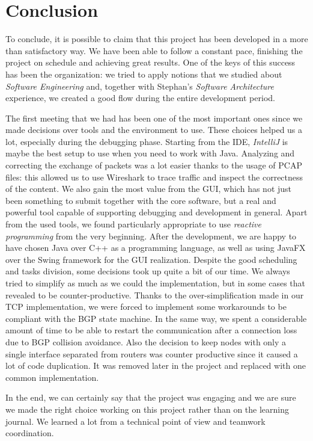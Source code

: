 \chapter{Conclusion}
To conclude, it is possible to claim that this project has been developed in a more than satisfactory way.
We have been able to follow a constant pace, finishing the project on schedule and achieving great results.
One of the keys of this success has been the organization: we tried to apply notions that we studied about \textit{Software Engineering} and, together with Stephan's \textit{Software Architecture} experience, we created a good flow during the entire development period.

The first meeting that we had has been one of the most important ones since we made decisions over tools and the environment to use. These choices helped us a lot, especially during the debugging phase. Starting from the IDE, \textit{IntelliJ} is maybe the best setup to use when you need to work with Java. Analyzing and correcting the exchange of packets was a lot easier thanks to the usage of PCAP files: this allowed us to use Wireshark to trace traffic and inspect the correctness of the content.
We also gain the most value from the GUI, which has not just been something to submit together with the core software, but a real and powerful tool capable of supporting debugging and development in general.
Apart from the used tools, we found particularly appropriate to use \textit{reactive programming} from the very beginning. After the development, we are happy to have chosen Java over C++ as a programming language, as well as using JavaFX over the Swing framework for the GUI realization.
Despite the good scheduling and tasks division, some decisions took up quite a bit of our time. We always tried to simplify as much as we could the implementation, but in some cases that revealed to be counter-productive. Thanks to the over-simplification made in our TCP implementation, we were forced to implement some workarounds to be compliant with the BGP state machine. In the same way, we spent a considerable amount of time to be able to restart the communication after a connection loss due to BGP collision avoidance. Also the decision to keep nodes with only a single interface separated from routers was counter productive since it caused a lot of code duplication. It was removed later in the project and replaced with one common implementation.

In the end, we can certainly say that the project was engaging and we are sure we made the right choice working on this project rather than on the learning journal. We learned a lot from a technical point of view and teamwork coordination.
